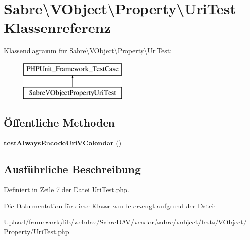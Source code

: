 \hypertarget{class_sabre_1_1_v_object_1_1_property_1_1_uri_test}{}\section{Sabre\textbackslash{}V\+Object\textbackslash{}Property\textbackslash{}Uri\+Test Klassenreferenz}
\label{class_sabre_1_1_v_object_1_1_property_1_1_uri_test}
Klassendiagramm für Sabre\textbackslash{}V\+Object\textbackslash{}Property\textbackslash{}Uri\+Test\+:\begin{figure}[H]
\begin{center}
\leavevmode
\includegraphics[height=2.000000cm]{class_sabre_1_1_v_object_1_1_property_1_1_uri_test}
\end{center}
\end{figure}
\subsection*{Öffentliche Methoden}
\begin{DoxyCompactItemize}
\item 
\mbox{\label{class_sabre_1_1_v_object_1_1_property_1_1_uri_test_a49fa0d08473ae0c78e184a5b89f936b8}} 
{\bfseries test\+Always\+Encode\+Uri\+V\+Calendar} ()
\end{DoxyCompactItemize}


\subsection{Ausführliche Beschreibung}


Definiert in Zeile 7 der Datei Uri\+Test.\+php.



Die Dokumentation für diese Klasse wurde erzeugt aufgrund der Datei\+:\begin{DoxyCompactItemize}
\item 
Upload/framework/lib/webdav/\+Sabre\+D\+A\+V/vendor/sabre/vobject/tests/\+V\+Object/\+Property/Uri\+Test.\+php\end{DoxyCompactItemize}
